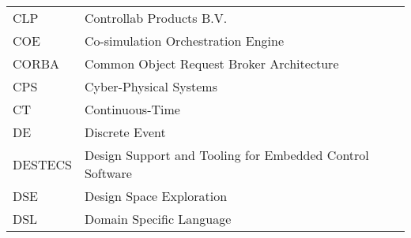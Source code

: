 \begin{longtable}{ll}
CLP	&Controllab Products B.V. \\
COE & Co-simulation Orchestration Engine \\
CORBA & Common Object Request Broker Architecture \\
CPS     & Cyber-Physical Systems\\
CT	&Continuous-Time\\
DE      &Discrete Event\\
DESTECS	&Design Support and Tooling for Embedded Control Software\\
DSE	&Design Space Exploration\\
DSL & Domain Specific Language \\

\end{longtable}
